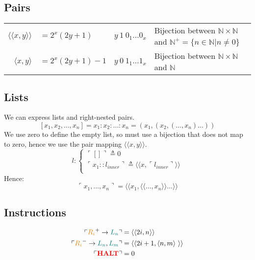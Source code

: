 \documentclass{report}
\begin{document}
            \subsection*{Pairs}
                \begin{center}
                    \begin{tabular}{r l c l}
                        $\langle\langle x, y \rangle\rangle $&$= 2^x(2y + 1)$ & $y \ 1 \ 0_1 \dots 0_x$ & Bijection between $\mathbb{N} \times \mathbb{N}$ and $\mathbb{N}^+ = \{n \in \mathbb{N} | n \neq 0\}$  \\
                        $\langle x, y \rangle $&$= 2^x(2y + 1) - 1$ &  $y \ 0 \ 1_1 \dots 1_x$ & Bijection between $\mathbb{N} \times \mathbb{N}$ and $\mathbb{N}$  \\
                    \end{tabular}
                \end{center}
            \subsection*{Lists}
                We can express lists and right-nested pairs.
                \[[x_1, x_2, \dots, x_n] = x_1:x_2:\dots:x_n = (x_1, (x_2, (\dots, x_n) \dots ))\]
                We use zero to define the empty list, so must use a bijection that does not map to zero, hence we use the pair mapping $\langle\langle x,y \rangle\rangle$.
                \[l : \begin{cases}
                    \ulcorner [] \urcorner \triangleq 0 \\
                    \ulcorner x_1 :: l_{inner} \urcorner \triangleq \langle\langle x, \ulcorner l_{inner} \urcorner \rangle\rangle \\
                \end{cases}\]
                Hence:
                \[\ulcorner x_1, \dots, x_n \urcorner = \langle\langle x_1 , \langle\langle \dots, x_n\rangle\rangle \dots \rangle\rangle\]
            \subsection*{Instructions}
                \[\begin{split}
                    \ulcorner \text{\textcolor{orange}{$R_{i}$}}^+ \to \text{\textcolor{teal}{$L_{n}$}} \urcorner &= \langle\langle 2i, n \rangle\rangle \\
                    \ulcorner \text{\textcolor{orange}{$R_{i}$}}^- \to \text{\textcolor{teal}{$L_{n}$}}, \text{\textcolor{teal}{$L_{m}$}} \urcorner &= \langle\langle 2i + 1, \langle n,m \rangle \  \rangle\rangle \\
                    \ulcorner \text{\textcolor{red}{\textbf{HALT}}} \urcorner &= 0 \\
                \end{split}\]
\end{document}
